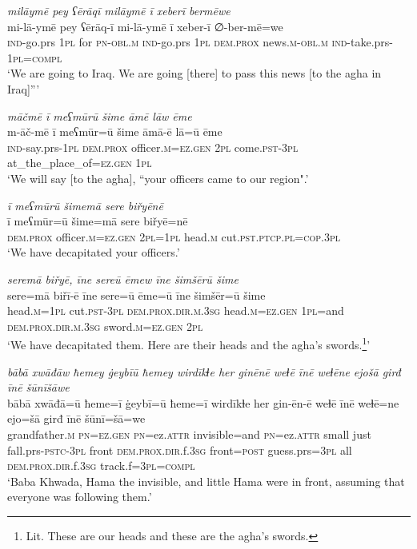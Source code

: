 \ea \label{BP.79}
\textit{milāymē pey ʕērāqī milāymē ī xeberī bermēwe} \\ 
\gll mi-lā-ymē pey ʕērāq-ī mi-lā-ymē ī xeber-ī ∅-ber-mē=we \\ 
 \textsc{ind-}go.prs \textsc{1pl} for \textsc{pn}\textsc{-obl}\textsc{.m} \textsc{ind-}go.prs \textsc{1pl} \textsc{dem.prox} news\textsc{.m}\textsc{-obl}\textsc{.m} \textsc{ind-}take.prs\textsc{-\textsc{1pl}}\textsc{=compl} \\ 
\glt `We are going to Iraq. We are going [there] to pass this news [to the agha in Iraq]”'
\z 
 
\ea \label{BP.90}
\textit{māčmē ī meʕmūrū šime āmē lāw ēme} \\ 
\gll m-āč-mē ī meʕmūr=ū šime āmā-ē lā=ū ēme \\ 
 \textsc{ind-}say.prs\textsc{-\textsc{1pl}} \textsc{dem.prox} officer\textsc{.m}\textsc{=ez.gen} \textsc{2pl} come\textsc{.pst}\textsc{-3pl} at\_the\_place\_of\textsc{=ez.gen} \textsc{1pl} \\ 
\glt `We will say [to the agha], “your officers came to our region".'
\z 
 
\ea \label{BP.96}
\textit{ī meʕmūrū šimemā sere biřyēnē} \\ 
\gll ī meʕmūr=ū šime=mā sere biřyē=nē \\ 
 \textsc{dem.prox} officer\textsc{.m}\textsc{=ez.gen} \textsc{2pl}\textsc{=\textsc{1pl}} head\textsc{.m} cut\textsc{.pst}\textsc{.ptcp}\textsc{.pl}\textsc{=cop}\textsc{.3pl} \\ 
\glt `We have decapitated your officers.'
\z 
 
\ea \label{BP.97}
\textit{seremā biřyē, īne sereū ēmew īne šimšērū šime} \\ 
\gll sere=mā biřī-ē īne sere=ū ēme=ū īne šimšēr=ū šime \\ 
 head\textsc{.m}\textsc{=\textsc{1pl}} cut\textsc{.pst}\textsc{-3pl} \textsc{dem.prox}\textsc{.dir}\textsc{.m}\textsc{.3sg} head\textsc{.m}\textsc{=ez.gen} \textsc{1pl}=and \textsc{dem.prox}\textsc{.dir}\textsc{.m}\textsc{.3sg} sword\textsc{.m}\textsc{=ez.gen} \textsc{2pl} \\ 
\glt `We have decapitated them. Here are their heads and the agha’s swords.\footnote{Lit. These are our heads and these are the agha’s swords.}'
\z 
 
\ea \label{BP.105}
\textit{bābā xwāđāw ħemey ġeybīū ħemey wirdīkɫe her ginēnē weɫē īnē weɫēne ejošā girđ īnē šūnīšāwe} \\ 
\gll bābā xwāđā=ū ħeme=ī ġeybī=ū ħeme=ī wirdīkɫe her gin-ēn-ē weɫē īnē weɫē=ne ejo=šā girđ īnē šūnī=šā=we \\ 
 grandfather\textsc{.m} \textsc{pn}\textsc{=ez.gen} \textsc{pn}=ez.\textsc{attr} invisible=and \textsc{pn}=ez.\textsc{attr} small just fall.prs\textsc{-pstc}\textsc{-3pl} front \textsc{dem.prox}\textsc{.dir}.f\textsc{.3sg} front\textsc{=\textsc{post}} guess.prs\textsc{=3pl} all \textsc{dem.prox}\textsc{.dir}.f\textsc{.3sg} track.f\textsc{=3pl}\textsc{=compl} \\ 
\glt `Baba Khwada, Hama the invisible, and little Hama were in front, assuming that everyone was following them.'
\z 
 
